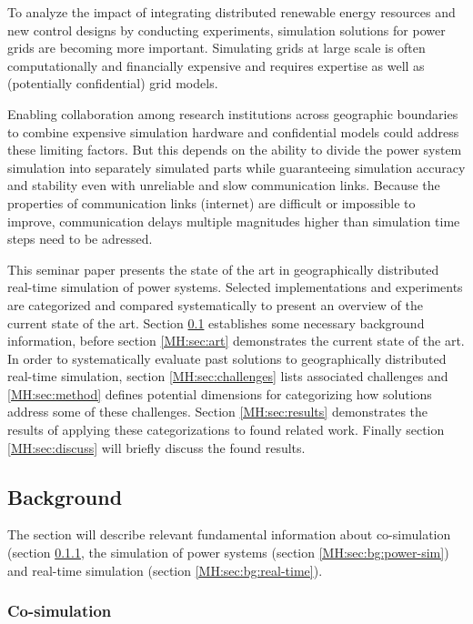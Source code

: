 \documentclass[a4paper,ngerman]{atseminar}
\begin{document}
To analyze the impact of integrating distributed renewable energy resources and new control designs by conducting experiments, simulation solutions for power grids are becoming more important. Simulating grids at large scale is often computationally and financially expensive and requires expertise as well as (potentially confidential) grid models.

Enabling collaboration among research institutions across geographic boundaries to combine expensive simulation hardware and confidential models could address these limiting factors. 
But this depends on the ability to divide the power system simulation into separately simulated parts while guaranteeing simulation accuracy and stability even with unreliable and slow communication links. Because the properties of communication links (internet) are difficult or impossible to improve, communication delays multiple magnitudes higher than simulation time steps need to be adressed.

This seminar paper presents the state of the art in geographically distributed real-time simulation of power systems. Selected implementations and experiments are categorized and compared systematically to present an overview of the current state of the art. Section \ref{MH:sec:bg} establishes some necessary background information, before section \ref{MH:sec:art} demonstrates the current state of the art. In order to systematically evaluate past solutions to geographically distributed real-time simulation, section \ref{MH:sec:challenges} lists associated challenges and \ref{MH:sec:method} defines potential dimensions
for categorizing how solutions address some of these challenges. Section \ref{MH:sec:results} demonstrates the results of applying these categorizations to found related work. Finally section \ref{MH:sec:discuss} will briefly discuss the found results.


\subsection{Background}
\label{MH:sec:bg}

The section will describe relevant fundamental information about co-simulation (section \ref{MH:sec:bg:cosim}, the simulation of power systems (section \ref{MH:sec:bg:power-sim}) and real-time simulation (section \ref{MH:sec:bg:real-time}).

\subsubsection{Co-simulation}
\label{MH:sec:bg:cosim}
\end{document}
